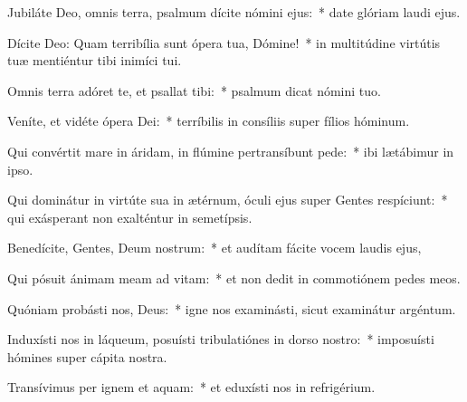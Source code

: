 \item Jubiláte Deo, omnis terra, psalmum dícite nómini ejus:~* date glóriam laudi ejus.

\item Dícite Deo: Quam terribília sunt ópera tua, Dómine!~* in multitúdine virtútis tuæ mentiéntur tibi inimíci tui.

\item Omnis terra adóret te, et psallat tibi:~* psalmum dicat nómini tuo.

\item Veníte, et vidéte ópera Dei:~* terríbilis in consíliis super fílios hóminum.

\item Qui convértit mare in áridam, in flúmine pertransíbunt pede:~* ibi lætábimur in ipso.

\item Qui dominátur in virtúte sua in ætérnum, óculi ejus super Gentes respíciunt:~* qui exásperant non exalténtur in semetípsis.

\item Benedícite, Gentes, Deum nostrum:~* et audítam fácite vocem laudis ejus,

\item Qui pósuit ánimam meam ad vitam:~* et non dedit in commotiónem pedes meos.

\item Quóniam probásti nos, Deus:~* igne nos examinásti, sicut examinátur argéntum.

\item Induxísti nos in láqueum, posuísti tribulatiónes in dorso nostro:~* imposuísti hómines super cápita nostra.

\item Transívimus per ignem et aquam:~* et eduxísti nos in refrigérium.
